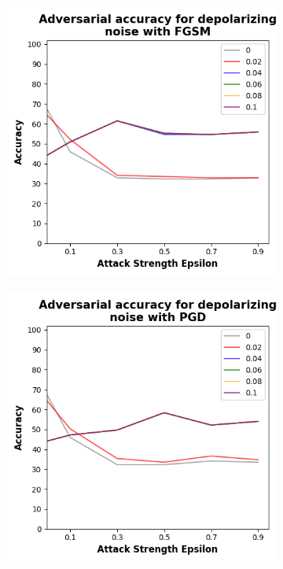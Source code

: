 \begin{figure}[!h]
  \centering

  \begin{subfigure}{0.45\textwidth}
      \includegraphics[width=\linewidth]{figures/evaluation_results/diabetes/pqc/figures/depolarizing-fgsm.png}
      \label{fig:diabetes11}
  \end{subfigure} \qquad
  \begin{subfigure}{0.45\textwidth}
      \includegraphics[width=\linewidth]{figures/evaluation_results/diabetes/pqc/figures/depolarizing-pgd.png}

\end{subfigure}
\end{figure}
